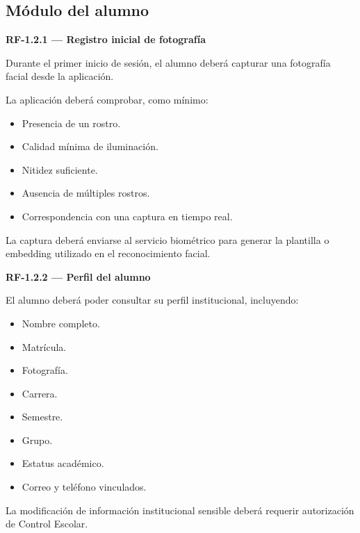 \documentclass[12pt,a4paper]{article}
\newcommand{\RF}[1]{\textbf{\color{primary}RF-#1}}
\newenvironment{requisito}[1]
{
\begin{center}
\begin{minipage}{0.96\textwidth}
\colorbox{requirement}{
\begin{minipage}{0.94\textwidth}
\textbf{#1}
\end{minipage}
}
\vspace{2mm}
}
{
\end{minipage}
\end{center}
}
\begin{document}
\subsection{Módulo del alumno}

\begin{requisito}{\RF{1.2.1} --- Registro inicial de fotografía}
Durante el primer inicio de sesión, el alumno deberá capturar una fotografía
facial desde la aplicación.

La aplicación deberá comprobar, como mínimo:

\begin{itemize}[leftmargin=*]
\item Presencia de un rostro.
\item Calidad mínima de iluminación.
\item Nitidez suficiente.
\item Ausencia de múltiples rostros.
\item Correspondencia con una captura en tiempo real.
\end{itemize}

La captura deberá enviarse al servicio biométrico para generar la plantilla o
embedding utilizado en el reconocimiento facial.
\end{requisito}

\begin{requisito}{\RF{1.2.2} --- Perfil del alumno}
El alumno deberá poder consultar su perfil institucional, incluyendo:

\begin{itemize}[leftmargin=*]
\item Nombre completo.
\item Matrícula.
\item Fotografía.
\item Carrera.
\item Semestre.
\item Grupo.
\item Estatus académico.
\item Correo y teléfono vinculados.
\end{itemize}

La modificación de información institucional sensible deberá requerir
autorización de Control Escolar.
\end{requisito}
\end{document}
